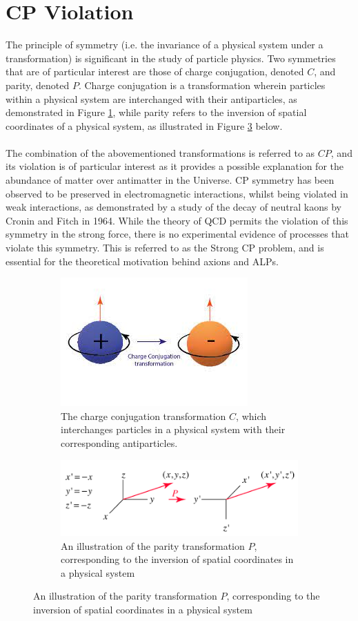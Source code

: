 \section{CP Violation}
The principle of symmetry (i.e. the invariance of a physical system under a transformation) is significant in the study of particle physics. Two symmetries that are of particular interest are those of charge conjugation, denoted $C$, and parity, denoted $P$. Charge conjugation is a transformation wherein particles within a physical system are interchanged with
their antiparticles, as demonstrated in Figure \ref{ChargeConjugation}, while parity refers to the inversion of spatial coordinates of a physical system, as illustrated in Figure \ref{ParityTransformation} below. 
\\
\\
The combination of the abovementioned transformations is referred to as $CP$, and its violation is of particular interest as it provides a possible explanation for the abundance of matter over antimatter in the Universe. CP symmetry has been observed to be preserved in electromagnetic interactions, whilst being violated in weak interactions, as demonstrated by 
a study of the decay of neutral kaons by Cronin and Fitch in 1964. While the theory of QCD permits the violation of this symmetry in the strong force, there is no experimental evidence of processes that violate this symmetry. This is referred to as the Strong CP problem, and is essential for the theoretical motivation behind axions and ALPs.
\begin{figure}[H]
    \centering
    \begin{subfigure}{0.5\textwidth}
        \includegraphics[]{ChargeConjugation.jpg}
        \caption{The charge conjugation transformation $C$, which interchanges particles in a physical system with their corresponding antiparticles.}
        \label{ChargeConjugation}
    \end{subfigure}
    \hfill
    \begin{subfigure}{0.7\textwidth}
        \includegraphics[]{ParityTransformation.png}
        \caption{An illustration of the parity transformation $P$, corresponding
        to the inversion of spatial coordinates in a physical system}
        \label{ParityTransformation}
    \end{subfigure}
    \hfill
\end{figure}

